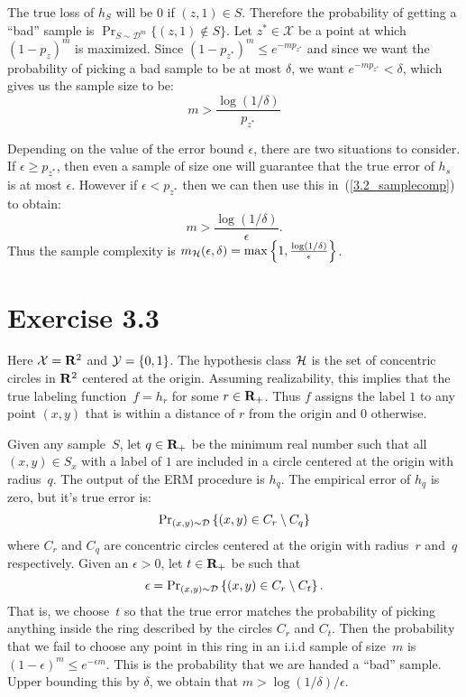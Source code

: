 The true loss of $h_S$ will be $0$ if $(z, 1) \in S$. Therefore the probability 
of getting a ``bad'' sample is $\Pr_{S \sim \mathcal{D}^m}\{(z, 1) \notin S\}$.
Let $z^{*} \in \mathcal{X}$ be a point at which $(1 - p_z)^m$ is maximized. Since 
$(1 - p_{z^{*}})^m \leq e^{- m p_{z^{*}}}$ and since we want the probability of 
picking a bad sample to be at most $\delta$, we want $e^{- m p_{z^{*}}} < \delta$,
which gives us the sample size to be:
\begin{equation}
\label{3.2_samplecomp}
	m  > \frac{\log (1 / \delta)}{p_{z^{*}}}
\end{equation}

Depending on the value of the error bound $\epsilon$, there are two situations to consider. If $\epsilon \geq p_{z^{*}}$, then even a sample of size one will guarantee 
that the true error of $h_s$ is at most $\epsilon$. However if 
$\epsilon < p_{z^{*}}$ then we can then use this in~(\ref{3.2_samplecomp})
to obtain: 
\[
    m > \frac{\log (1 / \delta)}{\epsilon}.
\]
Thus the sample complexity is $m_{\mathcal{H}}(\epsilon, \delta) = 
\max \left \{1, \frac{\log (1 / \delta)}{\epsilon} \right \}$.

\section*{Exercise 3.3}

Here $\mathcal{X} = \mathbf{R}^2$ and $\mathcal{Y} = \{0, 1\}$. The hypothesis class $\mathcal{H}$ is the set of concentric circles in $\mathbf{R}^2$ centered at the origin. Assuming realizability, this implies that the true labeling function~$f = h_r$ for some $r \in \mathbf{R}_{+}$. Thus $f$ assigns the label $1$ to any point $(x, y) $ that is within a distance of $r$ from the origin and $0$ otherwise. 

Given any sample~$S$, let $q \in \mathbf{R}_{+}$ be the minimum real number such that all $(x, y) \in S_x$ with a label of $1$ are included in a circle centered at the origin with radius~$q$. The output of the ERM procedure is $h_q$. The empirical error of $h_q$ is zero, but it's true error is:
\[
	\text{Pr}_{(x, y) \sim \mathcal{D}} \left \{ (x, y) \in C_r \setminus C_q \right \}
\]
where $C_r$ and $C_q$ are concentric circles centered at the origin with radius~$r$ and~$q$ respectively. Given an $\epsilon > 0$, let $t \in \mathbf{R}_{+}$ be such that 
$$\epsilon = \text{Pr}_{(x, y) \sim \mathcal{D}} \left \{ (x, y) \in C_r \setminus C_t \right \}.$$ 
That is, we choose~$t$ so that the true error matches the probability of picking anything inside the ring described by the circles $C_r$ and $C_t$. Then the probability that we fail to choose any point in this ring in an i.i.d sample of size~$m$ is $(1 - \epsilon)^m \leq e^{- \epsilon m}$. This is the probability that we are handed a ``bad'' sample. Upper bounding this by $\delta$, we obtain that $m > \log(1 / \delta) / \epsilon$.

